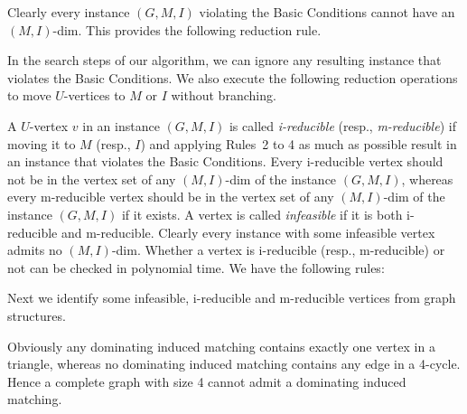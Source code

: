 \documentclass{elsart_TR2}
\begin{document}
Clearly every instance $(G,M,I)$ violating the Basic Conditions cannot have an $(M,I)$-dim.
This provides the following reduction rule.


In the search steps of our algorithm, we can ignore any resulting instance that violates
the Basic Conditions. We also execute the following reduction operations to move $U$-vertices  to $M$ or $I$ without branching.
  



A $U$-vertex $v$ in an instance $(G,M,I)$ is called \emph{i-reducible} (resp., \emph{m-reducible})
if  moving it to $M$ (resp., $I$) and applying Rules~2 to 4 as much as possible result in an instance that violates the Basic
Conditions.
Every i-reducible vertex should not be in the vertex set of any $(M,I)$-dim of the instance $(G,M,I)$,
whereas every m-reducible vertex should be in the vertex set of any $(M,I)$-dim of the instance $(G,M,I)$ if it exists.
A vertex is called \emph{infeasible} if it is both i-reducible and m-reducible.
Clearly every instance with some infeasible vertex admits no $(M,I)$-dim.
Whether a vertex is i-reducible (resp., m-reducible) or not can be checked in polynomial time. We have the following rules:



Next we identify some infeasible,   i-reducible and  m-reducible  vertices from graph structures.

Obviously any dominating induced matching contains exactly one vertex in a triangle,
whereas no dominating induced matching contains any edge in a 4-cycle.
Hence a complete graph with size 4 cannot admit a dominating induced matching.

\end{document}
